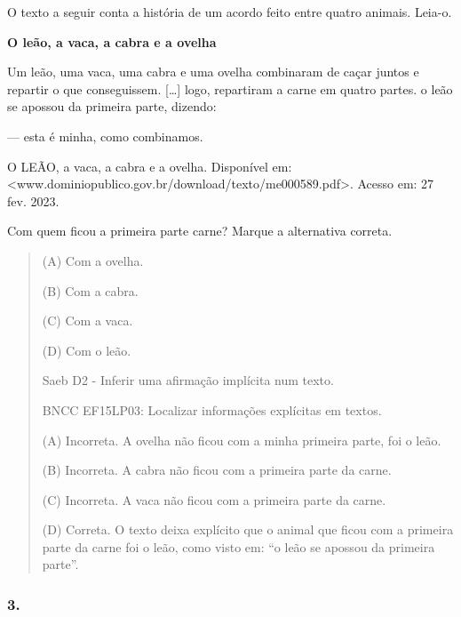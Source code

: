 O texto a seguir conta a história de um acordo feito entre quatro
animais. Leia-o.

\textbf{O leão, a vaca, a cabra e a ovelha}

Um leão, uma vaca, uma cabra e uma ovelha combinaram de caçar juntos e
repartir o que conseguissem. {[}\ldots{}{]} logo, repartiram a carne em
quatro partes. o leão se apossou da primeira parte, dizendo:

--- esta é minha, como combinamos.

O LEÃO, a vaca, a cabra e a ovelha. Disponível em:
\textless{}www.dominiopublico.gov.br/download/texto/me000589.pdf\textgreater{}.
Acesso em: 27 fev. 2023.

Com quem ficou a primeira parte carne? Marque a alternativa correta.

\begin{quote}
(A) Com a ovelha.

(B) Com a cabra.

(C) Com a vaca.

(D) Com o leão.

Saeb D2 - Inferir uma afirmação implícita num texto.

BNCC EF15LP03: Localizar informações explícitas em textos.

(A) Incorreta. A ovelha não ficou com a minha primeira parte, foi o
leão.

(B) Incorreta. A cabra não ficou com a primeira parte da carne.

(C) Incorreta. A vaca não ficou com a primeira parte da carne.

(D) Correta. O texto deixa explícito que o animal que ficou com a
primeira parte da carne foi o leão, como visto em: ``o leão se apossou
da primeira parte''.
\end{quote}

\subsubsection{3. }\label{section-82}


